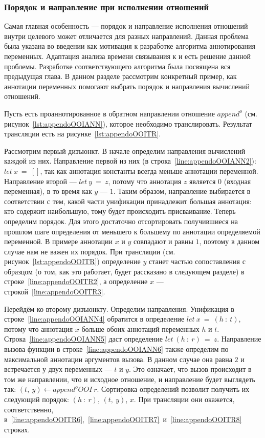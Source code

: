 
\subsubsection{Порядок и направление при исполнении отношений}

Самая главная особенность --- порядок и направление исполнения отношений внутри целевого может отличается для разных направлений.
Данная проблема была указана во введении как мотивация к разработке алгоритма аннотирования переменных.
Адаптация анализа времени связывания к \miniKanren{} и есть решение данной проблемы.
Разработке соответствующего алгоритма была посвящена вся предыдущая глава.
В данном разделе рассмотрим конкретный пример, как аннотации переменных помогают выбрать порядок и направления вычислений отношений.

Пусть есть проаннотированное в обратном направлении отношение $append^o$ (см. рисунок~\ref{lst:appendoOOIANN}), которое необходимо транслировать.
Результат трансляции есть на рисунке~\ref{lst:appendoOOITR}.

Рассмотрим первый дизъюнкт.
В начале определим направления вычислений каждой из них.
Направление первой из них (в строка~\ref{line:appendoOOIANN2}): $let~x~=~[]$, так как аннотация константы всегда меньше аннотации переменной.
Направление второй --- $let~y~=~z$, потому что аннотация $z$ является $0$ (входная переменная), в то время как $y$ --- $1$.
Таким образом, направление выбирается в соответствии с тем, какой части унификации принадлежит большая аннотация: кто содержит наибольшую, тому будет происходить присваивание.
Теперь определим порядок.
Для этого достаточно отсортировать получившиеся на прошлом шаге определения от меньшего к большему по аннотации определяемой переменной.
В примере аннотации $x$ и $y$ совпадают и равны $1$, поэтому в данном случае нам не важен их порядок.
При трансляции (см. рисунок~\ref{lst:appendoOOITR}) определение $y$ станет частью сопоставления с образцом (о том, как это работает, будет рассказано в следующем разделе) в строке~\ref{line:appendoOOITR2}, а определение $x$ --- строкой~\ref{line:appendoOOITR3}.

Перейдём ко второму дизъюнкту.
Определим направления.
Унификация в строке~\ref{line:appendoOOIANN4} обратится в определение $let~x~=~(h~:~t)$, потому что аннотация $x$ больше обоих аннотаций переменных $h$ и $t$.
Строка~\ref{line:appendoOOIANN5} даст определение $let~(h~:~r)~=~z$.
Направление вызова функции в строке~\ref{line:appendoOOIANN6} также определим по максимальной аннотации аргументов вызова.
В данном случае она равна $2$ и встречается у двух переменных --- $t$ и $y$.
Это означает, что вызов происходит в том же направлении, что и исходное отношение, и направление будет выглядеть так: $(t,~y) \leftarrow append^oOOI~r$.
Сортировка определений позволит получить их следующий порядок: $(h~:~r)$, $(t,~y)$, $x$.
При трансляции они окажется, соответственно, в~\ref{line:appendoOOITR6},~\ref{line:appendoOOITR7}~и~\ref{line:appendoOOITR8} строках.

